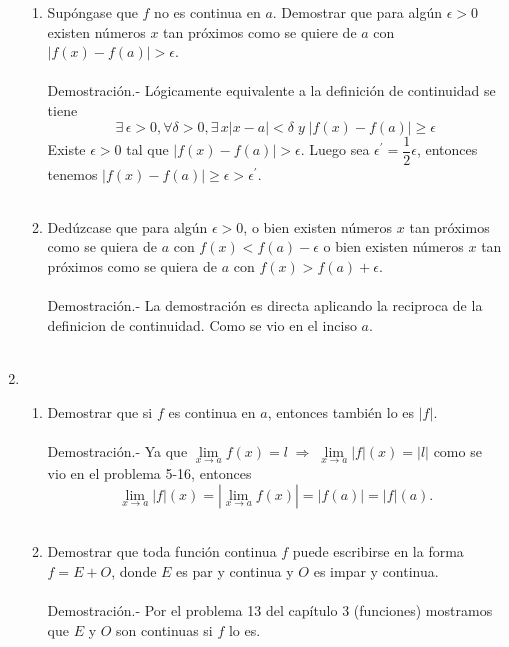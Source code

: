 \begin{enumerate}[\bfseries 1.]
\begin{enumerate}[\bfseries (a)]
    \item Supóngase que $f$ no es continua en $a$. Demostrar que para algún $\epsilon>0$ existen números $x$ tan próximos como se quiere de $a$ con $|f(x)-f(a)|>\epsilon$.\\\\
	Demostración.-\; Lógicamente equivalente a la definición de continuidad se tiene 
	$$\exists\,\epsilon>0, \forall \delta>0, \exists\, x |x-a|<\delta \; y \; |f(x)-f(a)|\geq \epsilon$$
	Existe $\epsilon > 0$ tal que $|f(x)-f(a)|>\epsilon$. Luego sea $\epsilon^{'}=\dfrac{1}{2}\epsilon$, entonces tenemos $|f(x)-f(a)|\geq \epsilon > \epsilon^{'}.$\\\\

    \item Dedúzcase que para algún $\epsilon>0$, o bien existen números $x$ tan próximos como se quiera de $a$ con $f(x)<f(a)-\epsilon$ o bien existen números $x$ tan próximos como se quiera de $a$ con $f(x)>f(a)+\epsilon$.\\\\
	Demostración.-\; La demostración es directa aplicando la reciproca de la definicion de continuidad. Como se vio en el inciso $a$.\\\\

\end{enumerate}

\item 
\begin{enumerate}[\bfseries (a)]

    \item Demostrar que si $f$ es continua en $a$, entonces también lo es $|f|$.\\\\
	Demostración.-\; Ya que $\lim\limits_{x\to a} f(x) = l \; \Longrightarrow \; \lim\limits_{x\to a} |f|(x) = |l|$ como se vio en el problema 5-16, entonces 
	$$\lim_{x\to a} |f|(x) = \left|\lim_{x\to a} f(x)\right| = |f(a)| = |f|(a).$$\\

    \item Demostrar que toda función continua $f$ puede escribirse en la forma $f=E+O$, donde $E$ es par y continua y $O$ es impar y continua.\\\\
	Demostración.-\; Por el problema 13 del capítulo 3 (funciones) mostramos que $E$ y $O$ son continuas si $f$ lo es.\\\\


\end{enumerate}
\end{enumerate}
